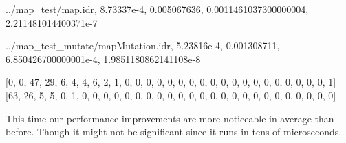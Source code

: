 \documentclass[
]{article}
\newenvironment{Shaded}{}{}
\newcommand{\DecValTok}[1]{\textcolor[rgb]{0.25,0.63,0.44}{#1}}
\newcommand{\FloatTok}[1]{\textcolor[rgb]{0.25,0.63,0.44}{#1}}
\newcommand{\FunctionTok}[1]{\textcolor[rgb]{0.02,0.16,0.49}{#1}}
\newcommand{\NormalTok}[1]{#1}
\newcommand{\OperatorTok}[1]{\textcolor[rgb]{0.40,0.40,0.40}{#1}}
\begin{document}
\begin{Shaded}
\begin{Highlighting}[]
\OperatorTok{../}\NormalTok{map\_test}\OperatorTok{/}\FunctionTok{map}\OperatorTok{.}\NormalTok{idr,}
\FloatTok{8.73337e{-}4}\NormalTok{,}
\FloatTok{0.005067636}\NormalTok{,}
\FloatTok{0.0011461037300000004}\NormalTok{,}
\FloatTok{2.211481014400371e{-}7}

\OperatorTok{../}\NormalTok{map\_test\_mutate}\OperatorTok{/}\NormalTok{mapMutation}\OperatorTok{.}\NormalTok{idr,}
\FloatTok{5.23816e{-}4}\NormalTok{,}
\FloatTok{0.001308711}\NormalTok{,}
\FloatTok{6.850426700000001e{-}4}\NormalTok{,}
\FloatTok{1.9851180862141108e{-}8}

\NormalTok{[}\DecValTok{0}\NormalTok{, }\DecValTok{0}\NormalTok{, }\DecValTok{47}\NormalTok{, }\DecValTok{29}\NormalTok{, }\DecValTok{6}\NormalTok{, }\DecValTok{4}\NormalTok{, }\DecValTok{4}\NormalTok{, }\DecValTok{6}\NormalTok{, }\DecValTok{2}\NormalTok{, }\DecValTok{1}\NormalTok{, }\DecValTok{0}\NormalTok{, }\DecValTok{0}\NormalTok{, }\DecValTok{0}\NormalTok{, }\DecValTok{0}\NormalTok{, }\DecValTok{0}\NormalTok{, }\DecValTok{0}\NormalTok{, }\DecValTok{0}\NormalTok{, }
\DecValTok{0}\NormalTok{, }\DecValTok{0}\NormalTok{, }\DecValTok{0}\NormalTok{, }\DecValTok{0}\NormalTok{, }\DecValTok{0}\NormalTok{, }\DecValTok{0}\NormalTok{, }\DecValTok{0}\NormalTok{, }\DecValTok{0}\NormalTok{, }\DecValTok{0}\NormalTok{, }\DecValTok{0}\NormalTok{, }\DecValTok{0}\NormalTok{, }\DecValTok{0}\NormalTok{, }\DecValTok{1}\NormalTok{]}
\NormalTok{[}\DecValTok{63}\NormalTok{, }\DecValTok{26}\NormalTok{, }\DecValTok{5}\NormalTok{, }\DecValTok{5}\NormalTok{, }\DecValTok{0}\NormalTok{, }\DecValTok{1}\NormalTok{, }\DecValTok{0}\NormalTok{, }\DecValTok{0}\NormalTok{, }\DecValTok{0}\NormalTok{, }\DecValTok{0}\NormalTok{, }\DecValTok{0}\NormalTok{, }\DecValTok{0}\NormalTok{, }\DecValTok{0}\NormalTok{, }\DecValTok{0}\NormalTok{, }\DecValTok{0}\NormalTok{, }\DecValTok{0}\NormalTok{, }\DecValTok{0}\NormalTok{, }
\DecValTok{0}\NormalTok{, }\DecValTok{0}\NormalTok{, }\DecValTok{0}\NormalTok{, }\DecValTok{0}\NormalTok{, }\DecValTok{0}\NormalTok{, }\DecValTok{0}\NormalTok{, }\DecValTok{0}\NormalTok{, }\DecValTok{0}\NormalTok{, }\DecValTok{0}\NormalTok{, }\DecValTok{0}\NormalTok{, }\DecValTok{0}\NormalTok{, }\DecValTok{0}\NormalTok{, }\DecValTok{0}\NormalTok{]}
\end{Highlighting}
\end{Shaded}

This time our performance improvements are more noticeable in average
than before. Though it might not be significant since it runs in tens of
microseconds.
\end{document}
